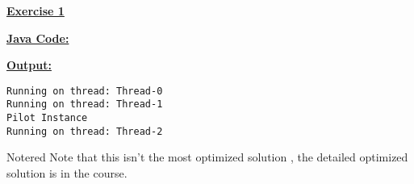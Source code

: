 \begin{center}
    \Huge{\textbf{\underline{Exercise 1}}}
\end{center}

\vspace{0.45cm}

\textbf{\underline{Java Code:}}
\vspace{0.1cm}


\vspace{0.5cm}


\vspace{1cm}

\textbf{\underline{Output:}}
\vspace{0.1cm}
\begin{lstlisting}[style=cmd]
Running on thread: Thread-0
Running on thread: Thread-1
Pilot Instance
Running on thread: Thread-2
\end{lstlisting}


\vspace{1cm}
\begin{prettyBox}{Note}{red}
Note that this isn't the most optimized solution , the detailed optimized solution
is in the course.
\end{prettyBox}

